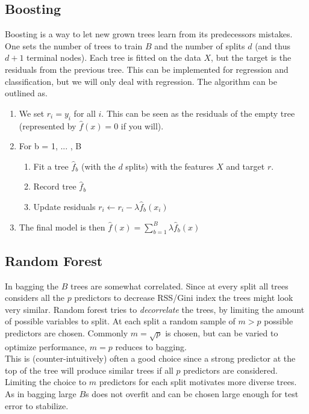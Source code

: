 \documentclass{article}
\begin{document}
\subsection{Boosting}
Boosting is a way to let new grown trees learn from its predecessors mistakes. One sets the number of trees to train $B$ and the number of splits $d$ (and thus $d+1$ terminal nodes). Each tree is fitted on the data $X$, but the target is the residuals from the previous tree. This can be implemented for regression and classification, but we will only deal with regression. The algorithm can be outlined as.

\begin{enumerate}
    \item We set $r_i = y_i$ for all $i$. This can be seen as the residuals of the empty tree (represented by $\hat{f}(x) = 0$ if you will).
    \item For b = 1, ... , B
    \begin{enumerate}
        \item Fit a tree $\hat{f}_b$ (with the $d$ splits) with the features $X$ and target $r$.
        \item Record tree $\hat{f}_b$ 
        \item Update residuals $r_i \xleftarrow{} r_i - \lambda \hat{f}_b(x_i)$
    \end{enumerate}
    \item The final model is then $\hat{f}(x) = \sum_{b = 1}^{B}\lambda \hat{f}_b(x)$
\end{enumerate}


\subsection{Random Forest}
In bagging the $B$ trees are somewhat correlated. Since at every split all trees considers all the $p$ predictors to decrease RSS/Gini index the trees might look very similar. Random forest tries to \textit{decorrelate} the trees, by limiting the amount of possible variables to split. At each split a random sample of $m > p$ possible predictors are chosen. Commonly $m = \sqrt{p}$ is chosen, but can be varied to optimize performance, $m = p$ reduces to bagging. 
\\
This is (counter-intuitively) often a good choice since a strong predictor at the top of the tree will produce similar trees if all $p$ predictors are considered. Limiting the choice to $m$ predictors for each split motivates more diverse trees. As in bagging large $B$s does not overfit and can be chosen large enough for test error to stabilize.   
\end{document}

